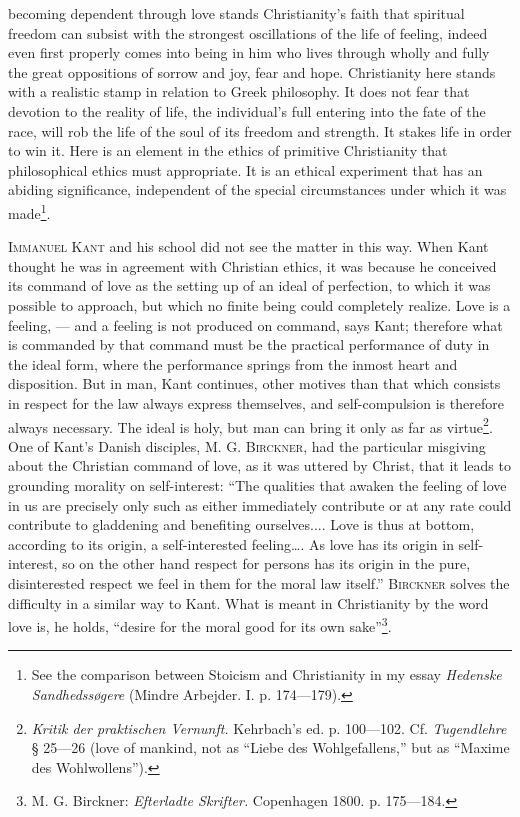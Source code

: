 \documentclass[12pt,a4paper,openany]{book}
\newcommand{\opage}[1]{\marginnote{\footnotesize\textit{[#1]}}}
\begin{document}
becoming dependent through love stands Christianity's faith that spiritual freedom can subsist with the strongest
oscillations of the life of feeling, indeed even first properly comes into being in
\opage{240}him who lives through wholly and fully the great oppositions of sorrow and joy, fear and hope. Christianity
here stands with a realistic stamp in relation to Greek philosophy. It does not fear that devotion to the reality of
life, the individual's full entering into the fate of the race, will rob the life of the soul of its freedom and
strength. It stakes life in order to win it. Here is an element in the ethics of primitive Christianity that
philosophical ethics must appropriate. It is an ethical experiment that has an abiding significance, independent of
the special circumstances under which it was made\footnote[1]{See the comparison between Stoicism and Christianity
in my essay \textit{Hedenske Sandhedssøgere} (Mindre Arbejder. I. p. 174---179).}.

\textsc{Immanuel Kant} and his school did not see the matter in this way. When Kant thought he was in agreement with
Christian ethics, it was because he conceived its command of love as the setting up of an ideal of perfection, to
which it was possible to approach, but which no finite being could completely realize. Love is a feeling, --- and a
feeling is not produced on command, says Kant; therefore what is commanded by that command must be the practical
performance of duty in the ideal form, where the performance springs from the inmost heart and disposition. But in
man, Kant continues, other motives than that which consists in respect for the law always express themselves, and
self-compulsion is therefore always necessary. The ideal is holy, but man can bring it only as far as
virtue\footnote[2]{\textit{Kritik der praktischen Vernunft.} Kehrbach's ed. p. 100---102. Cf. \textit{Tugendlehre}
§ 25---26 (love of mankind, not as ``Liebe des Wohlgefallens,'' but as ``Maxime des Wohlwollens'').}. One of Kant's
Danish disciples, M. G. \textsc{Birckner}, had the particular misgiving about the Christian command of love, as it was
uttered by Christ, that it leads to grounding morality on self-interest: ``The qualities that awaken the feeling of
love in us are precisely only such as either immediately contribute or at any rate could contribute to gladdening and
benefiting ourselves.... Love is thus at bottom, according to its origin, a self-interested feeling\dots{}. As love
has its origin in self-interest,
\opage{241}so on the other hand respect for persons has its origin in the pure, disinterested respect we feel in them
for the moral law itself.'' \textsc{Birckner} solves the difficulty in a similar way to Kant. What is meant in
Christianity by the word love is, he holds, ``desire for the moral good for its own sake''\footnote[1]{M. G.
Birckner: \textit{Efterladte Skrifter.} Copenhagen 1800. p. 175---184.}.
\end{document}
